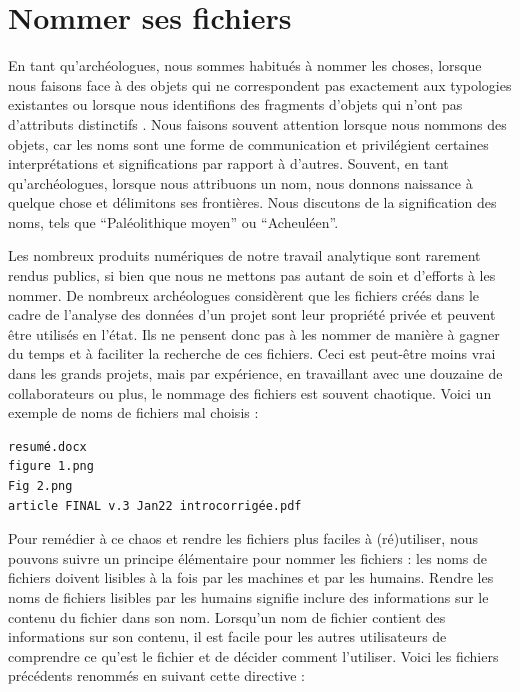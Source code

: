\documentclass[
  french,
]{scrbook}
\begin{document}
\hypertarget{nommer-ses-fichiers}{%
\section{Nommer ses fichiers}\label{nommer-ses-fichiers}}

En tant qu'archéologues, nous sommes habitués à nommer les choses, lorsque nous faisons face à des objets qui ne correspondent pas exactement aux typologies existantes ou lorsque nous identifions des fragments d'objets qui n'ont pas d'attributs distinctifs \autocite{kleindienst2006,ferris1999}. Nous faisons souvent attention lorsque nous nommons des objets, car les noms sont une forme de communication et privilégient certaines interprétations et significations par rapport à d'autres. Souvent, en tant qu'archéologues, lorsque nous attribuons un nom, nous donnons naissance à quelque chose et délimitons ses frontières. Nous discutons de la signification des noms, tels que ``Paléolithique moyen'' ou ``Acheuléen''.

Les nombreux produits numériques de notre travail analytique sont rarement rendus publics, si bien que nous ne mettons pas autant de soin et d'efforts à les nommer. De nombreux archéologues considèrent que les fichiers créés dans le cadre de l'analyse des données d'un projet sont leur propriété privée et peuvent être utilisés en l'état. Ils ne pensent donc pas à les nommer de manière à gagner du temps et à faciliter la recherche de ces fichiers. Ceci est peut-être moins vrai dans les grands projets, mais par expérience, en travaillant avec une douzaine de collaborateurs ou plus, le nommage des fichiers est souvent chaotique. Voici un exemple de noms de fichiers mal choisis :

\begin{verbatim}
resumé.docx
figure 1.png
Fig 2.png
article FINAL v.3 Jan22 introcorrigée.pdf
\end{verbatim}

Pour remédier à ce chaos et rendre les fichiers plus faciles à (ré)utiliser, nous pouvons suivre un principe élémentaire pour nommer les fichiers : les noms de fichiers doivent lisibles à la fois par les machines et par les humains. Rendre les noms de fichiers lisibles par les humains signifie inclure des informations sur le contenu du fichier dans son nom. Lorsqu'un nom de fichier contient des informations sur son contenu, il est facile pour les autres utilisateurs de comprendre ce qu'est le fichier et de décider comment l'utiliser. Voici les fichiers précédents renommés en suivant cette directive :
\end{document}

